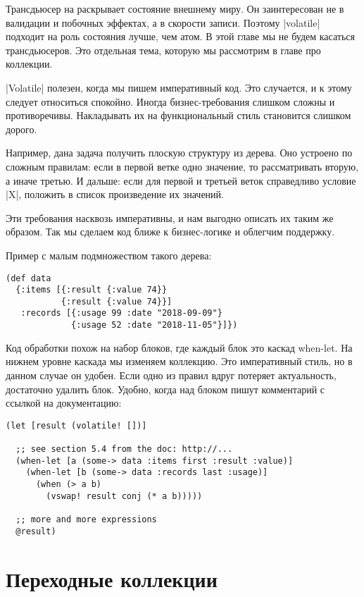 Трансдьюсер на раскрывает состояние внешнему миру. Он заинтересован не в
валидации и побочных эффектах, а в скорости записи. Поэтому \spverb|volatile| подходит
на роль состояния лучше, чем атом. В этой главе мы не будем касаться
трансдьюсеров. Это отдельная тема, которую мы рассмотрим в главе про коллекции.

\spverb|Volatile| полезен, когда мы пишем императивный код. Это случается, и к этому
следует относиться спокойно. Иногда бизнес-требования слишком сложны и
противоречивы. Накладывать их на функциональный стиль становится слишком дорого.

Например, дана задача получить плоскую структуру из дерева. Оно устроено по
сложным правилам: если в первой ветке одно значение, то рассматривать вторую, а
иначе третью. И дальше: если для первой и третьей веток справедливо условие \spverb|X|,
положить в список произведение их значений.

Эти требования насквозь императивны, и нам выгодно описать их таким же
образом. Так мы сделаем код ближе к бизнес-логике и облегчим поддержку.

Пример с малым подмножеством такого дерева:

\begin{verbatim}
(def data
  {:items [{:result {:value 74}}
           {:result {:value 74}}]
   :records [{:usage 99 :date "2018-09-09"}
             {:usage 52 :date "2018-11-05"}]})
\end{verbatim}

Код обработки похож на набор блоков, где каждый блок это каскад when-let. На
нижнем уровне каскада мы изменяем коллекцию. Это императивный стиль, но в данном
случае он удобен. Если одно из правил вдруг потеряет актуальность, достаточно
удалить блок. Удобно, когда над блоком пишут комментарий с ссылкой на
документацию:

\begin{verbatim}
(let [result (volatile! [])]

  ;; see section 5.4 from the doc: http://...
  (when-let [a (some-> data :items first :result :value)]
    (when-let [b (some-> data :records last :usage)]
      (when (> a b)
        (vswap! result conj (* a b)))))

  ;; more and more expressions
  @result)
\end{verbatim}

\section{Переходные коллекции}

